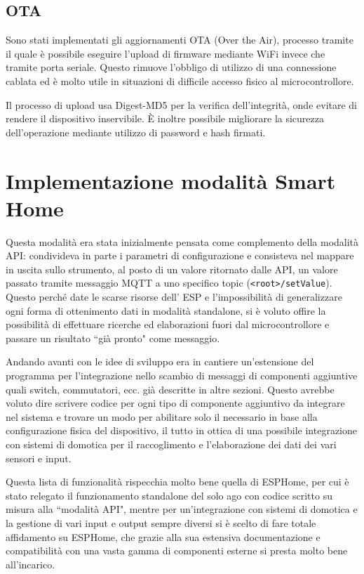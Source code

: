 \documentclass[12pt,a4paper]{report}
\begin{document}
\subsection{OTA}
Sono stati implementati gli aggiornamenti OTA (Over the Air), processo tramite il quale è possibile eseguire l'upload di firmware
mediante WiFi invece che tramite porta seriale. Questo rimuove l'obbligo di utilizzo di una connessione cablata ed è molto utile
in situazioni di difficile accesso fisico al microcontrollore.

Il processo di upload usa Digest-MD5 per la verifica dell'integrità, onde evitare di rendere il dispositivo inservibile. È inoltre possibile
migliorare la sicurezza dell'operazione mediante utilizzo di password e hash firmati. \cite{espota}

\section{Implementazione modalità Smart Home}
Questa modalità era stata inizialmente pensata come complemento della modalità API: condivideva in parte i parametri di configurazione
e consisteva nel mappare in uscita sullo strumento, al posto di un valore ritornato dalle API, un valore passato tramite messaggio MQTT
a uno specifico topic (\texttt{<root>/setValue}).
Questo perché date le scarse risorse dell' ESP e l'impossibilità di generalizzare ogni forma di ottenimento dati in modalità standalone,
si è voluto offire la possibilità di effettuare ricerche ed elaborazioni fuori dal microcontrollore e passare un risultato ``già pronto"
come messaggio.

Andando avanti con le idee di sviluppo era in cantiere un'estensione del programma per l'integrazione nello scambio di messaggi di
componenti aggiuntive quali switch, commutatori, ecc. già descritte in altre sezioni.
Questo avrebbe voluto dire scrivere codice per ogni tipo di componente aggiuntivo da integrare nel sistema e trovare un modo per
abilitare solo il necessario in base alla configurazione fisica del dispositivo,
il tutto in ottica di una possibile integrazione con sistemi di domotica per il raccoglimento e l'elaborazione dei dati dei vari sensori e input.

Questa lista di funzionalità rispecchia molto bene quella di ESPHome, per cui è stato relegato il funzionamento standalone del solo ago
con codice scritto su misura alla ``modalità API", mentre per un'integrazione con sistemi di domotica e la gestione di vari input e output
sempre diversi si è scelto di fare totale affidamento su ESPHome, che grazie alla sua estensiva documentazione e compatibilità con una
vasta gamma di componenti esterne si presta molto bene all'incarico.
\end{document}
